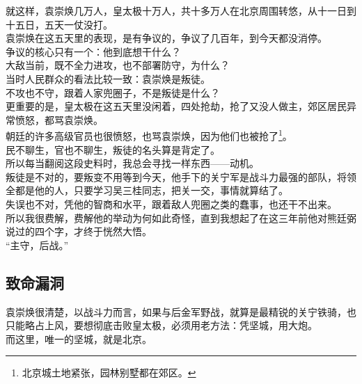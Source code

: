 \begin{multicols}{\theparacolNo}
就这样，袁崇焕几万人，皇太极十万人，共十多万人在北京周围转悠，从十一日到十五日，五天一仗没打。\\

袁崇焕在这五天里的表现，是有争议的，争议了几百年，到今天都没消停。\\

争议的核心只有一个：他到底想干什么？\\

大敌当前，既不全力进攻，也不部署防守，为什么？\\

当时人民群众的看法比较一致：袁崇焕是叛徒。\\

不攻也不守，跟着人家兜圈子，不是叛徒是什么？\\

更重要的是，皇太极在这五天里没闲着，四处抢劫，抢了又没人做主，郊区居民异常愤怒，都骂袁崇焕。\\

朝廷的许多高级官员也很愤怒，也骂袁崇焕，因为他们也被抢了\footnote{北京城土地紧张，园林别墅都在郊区。}。\\

民不聊生，官也不聊生，叛徒的名头算是背定了。\\

所以每当翻阅这段史料时，我总会寻找一样东西——动机。\\

叛徒是不对的，要叛变不用等到今天，他手下的关宁军是战斗力最强的部队，将领全都是他的人，只要学习吴三桂同志，把关一交，事情就算结了。\\

失误也不对，凭他的智商和水平，跟着敌人兜圈之类的蠢事，也还干不出来。\\

所以我很费解，费解他的举动为何如此奇怪，直到我想起了在这三年前他对熊廷弼说过的四个字，才终于恍然大悟。\\

“主守，后战。”\\

\subsection{致命漏洞}
袁崇焕很清楚，以战斗力而言，如果与后金军野战，就算是最精锐的关宁铁骑，也只能略占上风，要想彻底击败皇太极，必须用老方法：凭坚城，用大炮。\\

而这里，唯一的坚城，就是北京。\\


\end{multicols}
